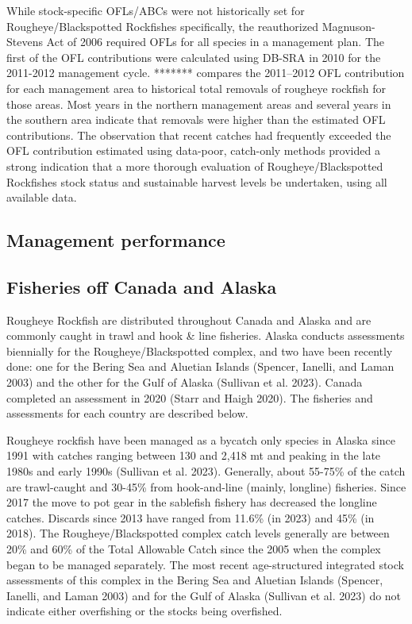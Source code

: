 \documentclass[
]{scrartcl}
\begin{document}
While stock-specific OFLs/ABCs were not historically set for
Rougheye/Blackspotted Rockfishes specifically, the reauthorized
Magnuson-Stevens Act of 2006 required OFLs for all species in a
management plan. The first of the OFL contributions were calculated
using DB-SRA in 2010 for the 2011-2012 management cycle. *******
compares the 2011--2012 OFL contribution for each management area to
historical total removals of rougheye rockfish for those areas. Most
years in the northern management areas and several years in the southern
area indicate that removals were higher than the estimated OFL
contributions. The observation that recent catches had frequently
exceeded the OFL contribution estimated using data-poor, catch-only
methods provided a strong indication that a more thorough evaluation of
Rougheye/Blackspotted Rockfishes stock status and sustainable harvest
levels be undertaken, using all available data.

\subsection{Management performance}\label{management-performance-1}

\subsection{Fisheries off Canada and
Alaska}\label{fisheries-off-canada-and-alaska}

Rougheye Rockfish are distributed throughout Canada and Alaska and are
commonly caught in trawl and hook \& line fisheries. Alaska conducts
assessments biennially for the Rougheye/Blackspotted complex, and two
have been recently done: one for the Bering Sea and Aluetian Islands
(Spencer, Ianelli, and Laman 2003) and the other for the Gulf of Alaska
(Sullivan et al. 2023). Canada completed an assessment in 2020 (Starr
and Haigh 2020). The fisheries and assessments for each country are
described below.

Rougheye rockfish have been managed as a bycatch only species in Alaska
since 1991 with catches ranging between 130 and 2,418 mt and peaking in
the late 1980s and early 1990s (Sullivan et al. 2023). Generally, about
55-75\% of the catch are trawl-caught and 30-45\% from hook-and-line
(mainly, longline) fisheries. Since 2017 the move to pot gear in the
sablefish fishery has decreased the longline catches. Discards since
2013 have ranged from 11.6\% (in 2023) and 45\% (in 2018). The
Rougheye/Blackspotted complex catch levels generally are between 20\%
and 60\% of the Total Allowable Catch since the 2005 when the complex
began to be managed separately. The most recent age-structured
integrated stock assessments of this complex in the Bering Sea and
Aluetian Islands (Spencer, Ianelli, and Laman 2003) and for the Gulf of
Alaska (Sullivan et al. 2023) do not indicate either overfishing or the
stocks being overfished.
\end{document}
